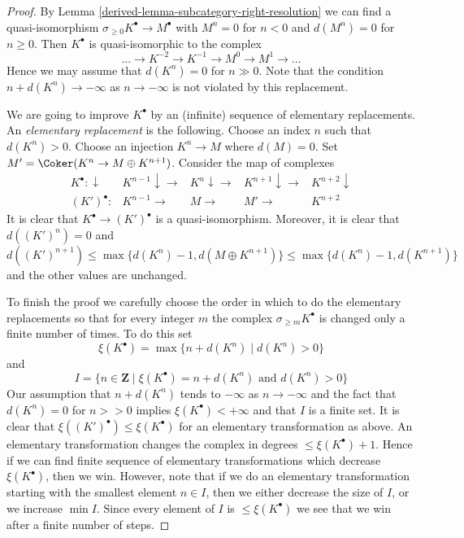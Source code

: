 \begin{proof}

By Lemma \ref{derived-lemma-subcategory-right-resolution} we can find a
quasi-isomorphism $\sigma_{\geq 0}K^\bullet \to M^\bullet$ with
$M^n = 0$ for $n < 0$ and $d(M^n) = 0$ for $n \geq 0$. Then $K^\bullet$
is quasi-isomorphic to the complex
$$
\ldots \to K^{-2} \to K^{-1} \to M^0 \to M^1 \to \ldots
$$
Hence we may assume that $d(K^n) = 0$ for $n \gg 0$. Note that
the condition $n + d(K^n) \to -\infty$ as $n \to -\infty$ is not
violated by this replacement.

\medskip\noindent
We are going to improve $K^\bullet$ by an (infinite) sequence of
elementary replacements. An {\it elementary replacement} is the following.
Choose an index $n$ such that $d(K^n) > 0$. Choose an injection
$K^n \to M$ where $d(M) = 0$. Set
$M' = \Coker(K^n \to M \oplus K^{n + 1})$. Consider the map of complexes
$$
\begin{array}{ccccc}K^\bullet : \downarrow & K^{n - 1} \downarrow\longrightarrow & K^n \downarrow\longrightarrow & K^{n + 1} \downarrow\longrightarrow & K^{n + 2} \downarrow \\ (K')^\bullet : & K^{n - 1} \longrightarrow & M \longrightarrow & M' \longrightarrow & K^{n + 2}\end{array}
$$
It is clear that $K^\bullet \to (K')^\bullet$ is a quasi-isomorphism.
Moreover, it is clear that $d((K')^n) = 0$ and
$$
d((K')^{n + 1}) \leq \max\{d(K^n) - 1, d(M \oplus K^{n + 1})\} \leq
\max\{d(K^n) - 1, d(K^{n + 1})\}
$$
and the other values are unchanged.

\medskip\noindent
To finish the proof we carefully choose the order in which to do
the elementary replacements so that for every integer $m$ the complex
$\sigma_{\geq m}K^\bullet$ is changed only a finite number of times.
To do this set
$$
\xi(K^\bullet) = \max \{n + d(K^n) \mid d(K^n) > 0\}
$$
and
$$
I = \{n \in \mathbf{Z} \mid \xi(K^\bullet) = n + d(K^n)
\text{ and }
 d(K^n) > 0\}
$$
Our assumption that $n + d(K^n)$ tends to $-\infty$ as $n \to -\infty$
and the fact that $d(K^n) = 0$ for $n >> 0$
implies $\xi(K^\bullet) < +\infty$ and that $I$ is a finite set.
It is clear that $\xi((K')^\bullet) \leq \xi(K^\bullet)$ for an
elementary transformation as above. An elementary transformation
changes the complex in degrees $\leq \xi(K^\bullet) + 1$. Hence if we can
find finite sequence of elementary transformations which
decrease $\xi(K^\bullet)$, then we win. However, note that if we
do an elementary transformation starting with the smallest element
$n \in I$, then we either decrease the size of $I$, or we increase
$\min I$. Since every element of $I$ is $\leq \xi(K^\bullet)$ we see
that we win after a finite number of steps.
\end{proof}

